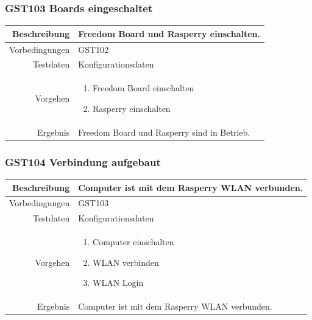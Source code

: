 \subsubsection{GST103 Boards eingeschaltet}
\begin{table}[h!]
	\renewcommand{\arraystretch}{1.5}
	\begin{tabular}{|r|p{14cm}|}
		\hline Beschreibung & Freedom Board und Rasperry einschalten. \\ 
		\hline Vorbedingungen &  GST102\\ 
		\hline Testdaten & Konfigurationsdaten \\ 
		\hline Vorgehen & 
		\begin{enumerate}
			\item Freedom Board einschalten
			\item Rasperry einschalten
		\end{enumerate} \\ 
		\hline Ergebnis & Freedom Board und Rasperry sind in Betrieb. \\ 
		\hline 
	\end{tabular}
\end{table}

\subsubsection{GST104 Verbindung aufgebaut}
\begin{table}[h!]
	\renewcommand{\arraystretch}{1.5}
	\begin{tabular}{|r|p{14cm}|}
		\hline Beschreibung & Computer ist mit dem Rasperry WLAN verbunden. \\ 
		\hline Vorbedingungen &  GST103\\ 
		\hline Testdaten & Konfigurationsdaten \\ 
		\hline Vorgehen & 
		\begin{enumerate}
			\item Computer einschalten
			\item WLAN verbinden
			\item WLAN Login
		\end{enumerate} \\ 
		\hline Ergebnis & Computer ist mit dem Rasperry WLAN verbunden. \\ 
		\hline 
	\end{tabular}
\end{table}

